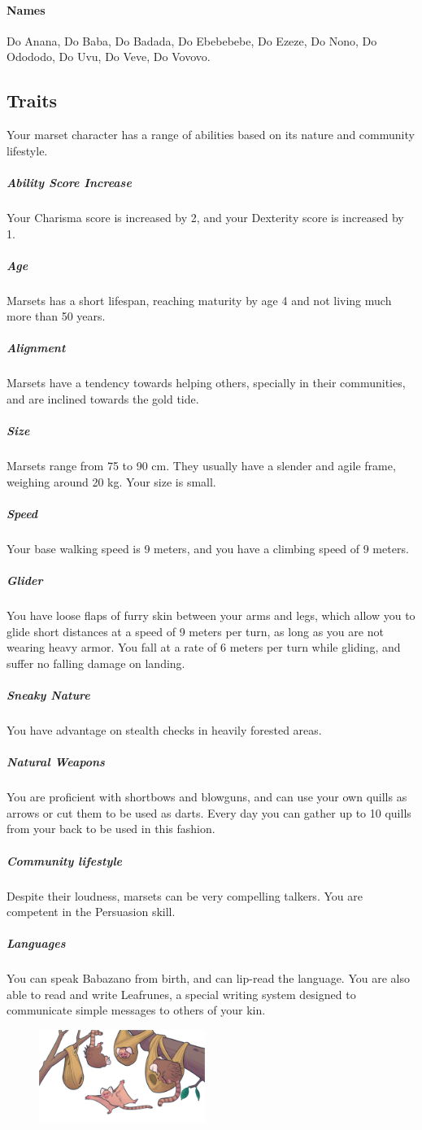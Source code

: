 \begin{linenumbers}
\paragraph{Names} Do Anana, Do Baba, Do Badada, Do Ebebebebe, Do Ezeze, Do Nono, Do Odododo, Do Uvu, Do Veve, Do Vovovo.

\subsection*{Traits}
Your marset character has a range of abilities based on its nature and community lifestyle.

\subparagraph{Ability Score Increase} Your Charisma score is increased by 2, and your Dexterity score is increased by 1.

\subparagraph{Age} Marsets has a short lifespan, reaching maturity by age 4 and not living much more than 50 years.

\subparagraph{Alignment} Marsets have a tendency towards helping others, specially in their communities, and are inclined towards the gold tide.

\subparagraph{Size} Marsets range from 75 to 90 cm.
They usually have a slender and agile frame, weighing around 20 kg.
Your size is small.

\subparagraph{Speed} Your base walking speed is 9 meters, and you have a climbing speed of 9 meters.

\subparagraph{Glider} You have loose flaps of furry skin between your arms and legs, which allow you to glide short distances at a speed of 9 meters per turn, as long as you are not wearing heavy armor.
You fall at a rate of 6 meters per turn while gliding, and suffer no falling damage on landing.

\subparagraph{Sneaky Nature} You have advantage on stealth checks in heavily forested areas.

\subparagraph{Natural Weapons} You are proficient with shortbows and blowguns, and can use your own quills as arrows or cut them to be used as darts.
Every day you can gather up to 10 quills from your back to be used in this fashion.

\subparagraph{Community lifestyle} Despite their loudness, marsets can be very compelling talkers.
You are competent in the Persuasion skill.

\subparagraph{Languages} You can speak Babazano from birth, and can lip-read the language.
You are also able to read and write Leafrunes, a special writing system designed to communicate simple messages to others of your kin.

\begin{figure}[!b]
    \centering
    \includegraphics[width=0.48\textwidth]{02kins/img/13marset_colony.png}
\end{figure}
\end{linenumbers}

\newpage
